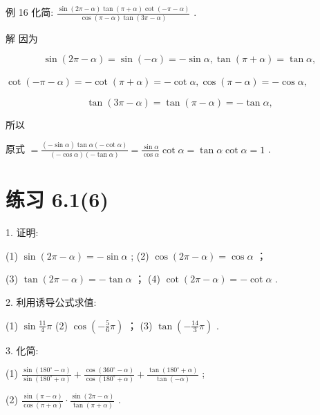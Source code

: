 \documentclass[10pt]{article}
\begin{document}
例 16 化简: \(\frac{\sin \left( {{2\pi } - \alpha }\right) \tan \left( {\pi  + \alpha }\right) \cot \left( {-\pi  - \alpha }\right) }{\cos \left( {\pi  - \alpha }\right) \tan \left( {{3\pi } - \alpha }\right) }\) .

解 因为

\[
\sin \left( {{2\pi } - \alpha }\right)  = \sin \left( {-\alpha }\right)  =  - \sin \alpha ,\tan \left( {\pi  + \alpha }\right)  = \tan \alpha ,
\]

\(\cot \left( {-\pi  - \alpha }\right)  =  - \cot \left( {\pi  + \alpha }\right)  =  - \cot \alpha ,\cos \left( {\pi  - \alpha }\right)  =  - \cos \alpha ,\)

\[
\tan \left( {{3\pi } - \alpha }\right)  = \tan \left( {\pi  - \alpha }\right)  =  - \tan \alpha ,
\]

所以

原式 \(= \frac{\left( {-\sin \alpha }\right) \tan \alpha \left( {-\cot \alpha }\right) }{\left( {-\cos \alpha }\right) \left( {-\tan \alpha }\right) } = \frac{\sin \alpha }{\cos \alpha }\cot \alpha  = \tan \alpha \cot \alpha  = 1\) .

\section*{练习 6.1(6)}

1. 证明:

(1) \(\sin \left( {{2\pi } - \alpha }\right)  =  - \sin \alpha\) ; (2) \(\cos \left( {{2\pi } - \alpha }\right)  = \cos \alpha\) ；

(3) \(\tan \left( {{2\pi } - \alpha }\right)  =  - \tan \alpha\) ； (4) \(\cot \left( {{2\pi } - \alpha }\right)  =  - \cot \alpha\) .

2. 利用诱导公式求值:

(1) \(\sin \frac{11}{4}\pi\) (2) \(\cos \left( {-\frac{5}{6}\pi }\right)\) ； (3) \(\tan \left( {-\frac{14}{3}\pi }\right)\) .

3. 化简:

(1) \(\frac{\sin \left( {{180}^{ \circ  } - \alpha }\right) }{\sin \left( {{180}^{ \circ  } + \alpha }\right) } + \frac{\cos \left( {{360}^{ \circ  } - \alpha }\right) }{\cos \left( {{180}^{ \circ  } + \alpha }\right) } + \frac{\tan \left( {{180}^{ \circ  } + \alpha }\right) }{\tan \left( {-\alpha }\right) }\) ;

(2) \(\frac{\sin \left( {\pi  - \alpha }\right) }{\cos \left( {\pi  + \alpha }\right) } \cdot  \frac{\sin \left( {{2\pi } - \alpha }\right) }{\tan \left( {\pi  + \alpha }\right) }\) .
\end{document}

